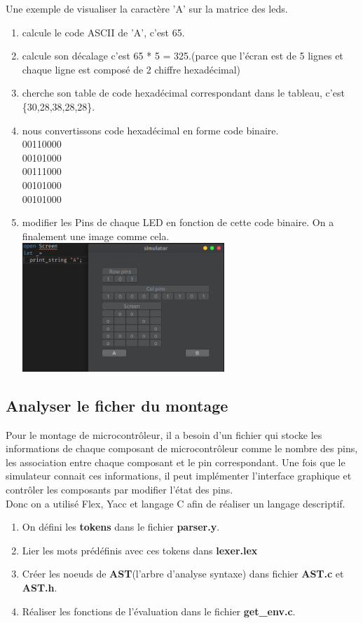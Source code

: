 \documentclass[14px]{article}
\begin{document}
Une exemple de visualiser la caractère 'A' sur la matrice des leds.
\begin{enumerate}
	\item calcule le code ASCII de 'A', c'est 65.
	\item calcule son décalage c'est 65 * 5 = 325.(parce que l'écran est de 5 lignes et chaque ligne est composé de 2 chiffre hexadécimal)
	\item cherche son table de code hexadécimal correspondant dans le tableau, c'est \{30,28,38,28,28\}.
	\item nous convertissons code hexadécimal en forme code binaire.\\
	00110000\\
	00101000\\
	00111000\\
	00101000\\
	00101000\\
	\item modifier les Pins de chaque LED en fonction de cette code binaire. On a finalement une image comme cela.\\
	\centering
	\includegraphics[width=0.6\textwidth]{printA.png}\\[1cm]

\end{enumerate}

\clearpage

\subsection{Analyser le ficher du montage}
Pour le montage de microcontrôleur, il a besoin d'un fichier qui stocke les informations de chaque composant de microcontrôleur comme le nombre des pins, les association entre chaque composant et le pin correspondant. Une fois que le simulateur connait ces informations, il peut implémenter l'interface graphique et contrôler les composants par modifier l'état des pins.\\
Donc on a utilisé Flex, Yacc et langage C afin de réaliser un langage descriptif.
\begin{enumerate}
	\item On défini les \textbf{tokens} dans le fichier \textbf{parser.y}.
	\item Lier les mots prédéfinis avec ces tokens dans \textbf{lexer.lex}
	\item Créer les noeuds de \textbf{AST}(l'arbre d'analyse syntaxe) dans fichier \textbf{AST.c} et \textbf{AST.h}.
	\item Réaliser les fonctions de l'évaluation dans le fichier \textbf{get\_env.c}.
\end{enumerate}
\end{document}
